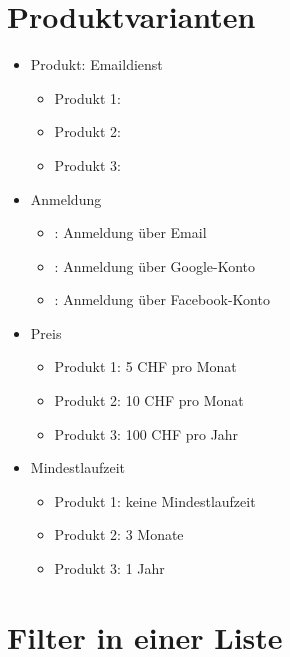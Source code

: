 \documentclass{article}
\begin{document}
\section{Produktvarianten}
\begin{itemize}
\item Produkt: Emaildienst
\begin{itemize}
\item Produkt 1: \productOne
\item Produkt 2: \productTwo
\item Produkt 3: \productThree
\end{itemize}
\item Anmeldung 
\begin{itemize}
\item \productOne : Anmeldung über Email
\item \productTwo : Anmeldung über Google-Konto
\item \productThree : Anmeldung über Facebook-Konto  
\end{itemize}
\item Preis 
\begin{itemize}
\item Produkt 1: 5 CHF pro Monat
\item Produkt 2: 10 CHF pro Monat
\item Produkt 3: 100 CHF pro Jahr
\end{itemize}
\item Mindestlaufzeit
\begin{itemize}
\item Produkt 1: keine Mindestlaufzeit
\item Produkt 2: 3 Monate
\item Produkt 3: 1 Jahr 
\end{itemize}
\end{itemize}
\section{Filter in einer Liste}
\end{document}
